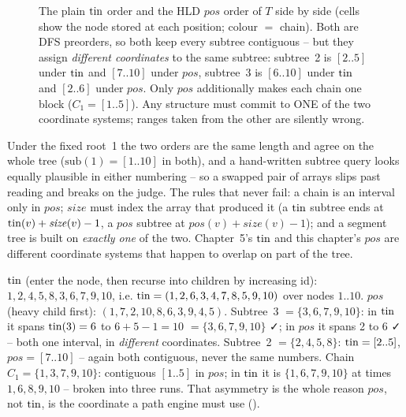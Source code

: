 \begin{figure}[H]
\begin{tikzpicture}
\end{tikzpicture}
\caption{The plain \(\operatorname{tin}\) order and the HLD \(\mathit{pos}\) order of \(T\) side by side (cells show the node stored at each position; colour \(=\) chain). Both are DFS preorders, so both keep every subtree contiguous -- but they assign \emph{different coordinates} to the same subtree: subtree~2 is \([2..5]\) under \(\operatorname{tin}\) and \([7..10]\) under \(\mathit{pos}\), subtree~3 is \([6..10]\) under \(\operatorname{tin}\) and \([2..6]\) under \(\mathit{pos}\). Only \(\mathit{pos}\) additionally makes each chain one block (\(C_1=[1..5]\)). Any structure must commit to ONE of the two coordinate systems; ranges taken from the other are silently wrong.}
\label{fig:c16-orders}
\end{figure}

\begin{warningbox}
Under the fixed root~1 the two orders are the same length and agree on the whole tree (\(\text{sub}(1)=[1..10]\) in both), and a hand-written subtree query looks equally plausible in either numbering -- so a swapped pair of arrays slips past reading and breaks on the judge.  The rules that never fail: a chain is an interval only in \(\mathit{pos}\); \(\mathit{size}\) must index the array that produced it (a \(\operatorname{tin}\) subtree ends at \(\operatorname{tin}(v)+\mathit{size}(v)-1\), a \(\mathit{pos}\) subtree at \(\mathit{pos}(v)+\mathit{size}(v)-1\)); and a segment tree is built on \emph{exactly one} of the two.  Chapter~5's \(\operatorname{tin}\) and this chapter's \(\mathit{pos}\) are different coordinate systems that happen to overlap on part of the tree.
\end{warningbox}

\begin{tracebox}
\(\operatorname{tin}\) (enter the node, then recurse into children by increasing id): \(1,2,4,5,8,3,6,7,9,10\), i.\(\mathrm{e.}\) \(\operatorname{tin}=(1,2,6,3,4,7,8,5,9,10)\) over nodes \(1..10\). \(\mathit{pos}\) (heavy child first): \((1,7,2,10,8,6,3,9,4,5)\). Subtree~3 \(=\{3,6,7,9,10\}\): in \(\operatorname{tin}\) it spans \(\operatorname{tin}(3)=6\) to \(6+5-1=10\) \(=\{3,6,7,9,10\}\) ✓; in \(\mathit{pos}\) it spans 2 to 6 ✓ -- both one interval, in \emph{different} coordinates. Subtree~2 \(=\{2,4,5,8\}\): \(\operatorname{tin}=[2..5]\), \(\mathit{pos}=[7..10]\) -- again both contiguous, never the same numbers. Chain \(C_1=\{1,3,7,9,10\}\): contiguous \([1..5]\) in \(\mathit{pos}\); in \(\operatorname{tin}\) it is \(\{1,6,7,9,10\}\) at times \(1,6,8,9,10\) -- broken into three runs. That asymmetry is the whole reason \(\mathit{pos}\), not \(\operatorname{tin}\), is the coordinate a path engine must use ().
\end{tracebox}

